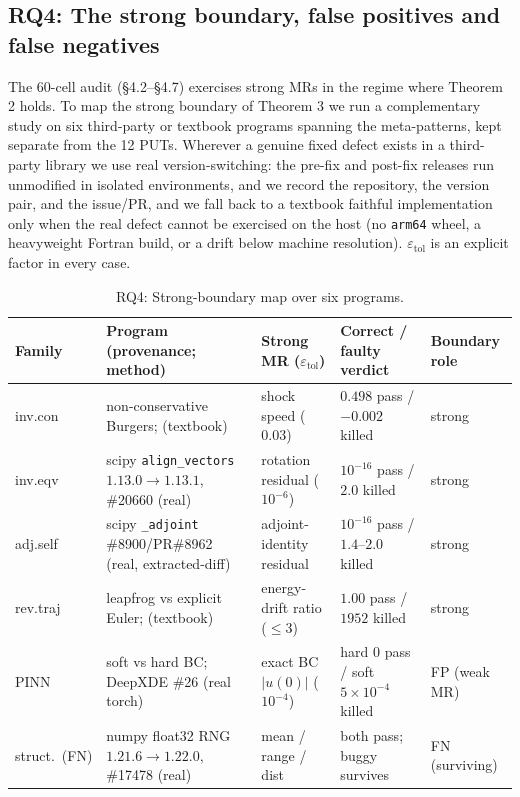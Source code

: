 \documentclass[manuscript,screen,review]{acmart}
\begin{document}
\subsection{RQ4: The strong boundary, false positives and false negatives}\label{rq4-strong-boundary}

The 60-cell audit (§4.2--§4.7) exercises strong MRs in the regime where
Theorem 2 holds. To map the strong boundary of Theorem 3 we run a
complementary study on six third-party or textbook programs spanning the
meta-patterns, kept separate from the 12 PUTs. Wherever a genuine fixed
defect exists in a third-party library we use real version-switching:
the pre-fix and post-fix releases run unmodified in isolated environments,
and we record the repository, the version pair, and the issue/PR, and
we fall back to a textbook faithful implementation only when the real
defect cannot be exercised on the host (no \texttt{arm64} wheel, a
heavyweight Fortran build, or a drift below machine resolution).
$\varepsilon_{\mathrm{tol}}$ is an explicit factor in every case.

{%
\begin{longtable}[]{@{}p{1.6cm}p{3.4cm}p{2.5cm}p{2.6cm}p{1.7cm}@{}}
\caption{RQ4: Strong-boundary map over six programs.}\label{tab:p2-30}\\
\toprule\noalign{}
Family & Program (provenance; method) & Strong MR ($\varepsilon_{\mathrm{tol}}$) & Correct / faulty verdict & Boundary role \\
\midrule\noalign{}
\endfirsthead
\endhead
\bottomrule\noalign{}
\endlastfoot
inv.con & non-conservative Burgers; \citep{hou1994nonconservative} (textbook) & shock speed ($0.03$) & $0.498$ pass / $-0.002$ killed & strong \\
inv.eqv & scipy \texttt{align\_vectors} $1.13.0\to1.13.1$, \#20660 (real) & rotation residual ($10^{-6}$) & $10^{-16}$ pass / $2.0$ killed & strong \\
adj.self & scipy \texttt{\_adjoint} \#8900/PR\#8962 (real, extracted-diff) & adjoint-identity residual & $10^{-16}$ pass / $1.4$--$2.0$ killed & strong \\
rev.traj & leapfrog vs explicit Euler; \citep{hairer2006geometric} (textbook) & energy-drift ratio ($\leq 3$) & $1.00$ pass / $1952$ killed & strong \\
PINN & soft vs hard BC; DeepXDE \#26 (real torch) & exact BC $|u(0)|$ ($10^{-4}$) & hard $0$ pass / soft $5\times10^{-4}$ killed & FP (weak MR) \\
struct.\ (FN) & numpy float32 RNG $1.21.6\to1.22.0$, \#17478 (real) & mean / range / dist & both pass; buggy survives & FN (surviving) \\
\end{longtable}
}
\end{document}
